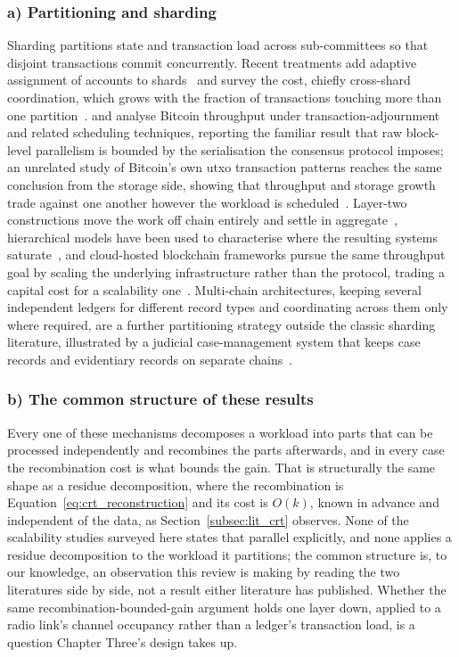 \documentclass[12pt,a4paper,oneside]{book}
\begin{document}
\subsubsection*{a) Partitioning and sharding}

Sharding partitions state and transaction load across sub-committees so that
disjoint transactions commit concurrently. Recent treatments add adaptive
assignment of accounts to shards~\cite{horvath2025assistedsharding} and survey
the cost, chiefly cross-shard coordination, which grows with the fraction of
transactions touching more than one partition~\cite{anonndscalabilitysolutions}.
\textcite{maiwada2024techniquesimprove} and
\textcite{maiwada2025blockchainscalability} analyse Bitcoin throughput under
transaction-adjournment and related scheduling techniques, reporting the
familiar result that raw block-level parallelism is bounded by the
serialisation the consensus protocol imposes; an unrelated study of Bitcoin's
own \gls{utxo} transaction patterns reaches the same conclusion from the
storage side, showing that throughput and storage growth trade against one
another however the workload is scheduled~\cite{melo2024unlockingblockchain}.
Layer-two constructions move the work off chain entirely and settle in
aggregate~\cite{patel2023blockchainlayer}, hierarchical models have been
used to characterise where the resulting systems
saturate~\cite{sadath2024scalabilityperformance}, and cloud-hosted
blockchain frameworks pursue the same throughput goal by scaling the
underlying infrastructure rather than the protocol, trading a capital cost
for a scalability
one~\cite{anonndoptimizedcloud}. Multi-chain architectures, keeping
several independent ledgers for different record types and coordinating
across them only where required, are a further partitioning strategy
outside the classic sharding literature, illustrated by a judicial
case-management system that keeps case records and evidentiary records on
separate chains~\cite{alyas2025multiblockchain}.

\subsubsection*{b) The common structure of these results}

Every one of these mechanisms decomposes a workload into parts that can be
processed independently and recombines the parts afterwards, and in every case
the recombination cost is what bounds the gain. That is structurally the same
shape as a residue decomposition, where the recombination is
Equation~\ref{eq:crt_reconstruction} and its cost is $O(k)$, known in advance
and independent of the data, as Section~\ref{subsec:lit_crt} observes. None of
the scalability studies surveyed here states that parallel explicitly, and
none applies a residue decomposition to the workload it partitions; the
common structure is, to our knowledge, an observation this review is making
by reading the two literatures side by side, not a result either literature
has published. Whether the same recombination-bounded-gain argument holds one
layer down, applied to a radio link's channel occupancy rather than a
ledger's transaction load, is a question Chapter Three's design takes up.
\end{document}
